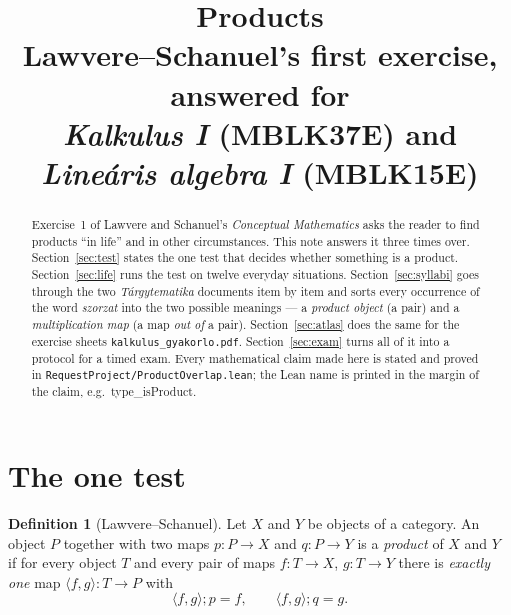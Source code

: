 \documentclass[11pt,a4paper]{article}
\title{\textbf{Products}\\[2mm]
\large Lawvere--Schanuel's first exercise, answered for\\
\emph{Kalkulus I} (MBLK37E) and \emph{Lineáris algebra I} (MBLK15E)}
\author{}
\date{}
\theoremstyle{definition}
\newtheorem{defn}{Definition}[section]
\newcommand{\lean}[1]{\textsf{\small #1}}
\begin{document}
\maketitle

\begin{abstract}
Exercise~1 of Lawvere and Schanuel's \emph{Conceptual Mathematics} asks the reader to find
products ``in life'' and in other circumstances.  This note answers it three times over.
Section~\ref{sec:test} states the one test that decides whether something is a product.
Section~\ref{sec:life} runs the test on twelve everyday situations.
Section~\ref{sec:syllabi} goes through the two \emph{Tárgytematika} documents item by item
and sorts every occurrence of the word \emph{szorzat} into the two possible meanings ---
a \emph{product object} (a pair) and a \emph{multiplication map} (a map \emph{out of} a
pair).  Section~\ref{sec:atlas} does the same for the exercise sheets
\texttt{kalkulus\_gyakorlo.pdf}.  Section~\ref{sec:exam} turns all of it into a protocol
for a timed exam.  Every mathematical claim made here is stated and proved in
\texttt{RequestProject/ProductOverlap.lean}; the Lean name is printed in the margin of the
claim, e.g.\ \lean{type\_isProduct}.
\end{abstract}

\tableofcontents

\section{The one test}\label{sec:test}

\begin{defn}[Lawvere--Schanuel]\label{def:prod}
Let $X$ and $Y$ be objects of a category.  An object $P$ together with two maps
$p:P\to X$ and $q:P\to Y$ is a \emph{product} of $X$ and $Y$ if for every object $T$ and
every pair of maps $f:T\to X$, $g:T\to Y$ there is \emph{exactly one} map
$\langle f,g\rangle : T\to P$ with
\[
  \langle f,g\rangle ; p = f, \qquad \langle f,g\rangle ; q = g .
\]
\end{defn}

\begin{center}
\end{center}
\end{document}
